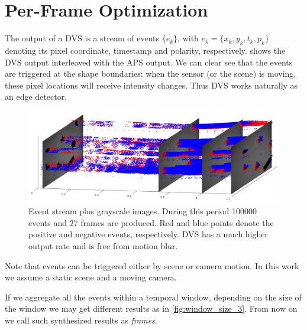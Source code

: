 \chapter{Per-Frame Optimization}
\label{chap:per_frame}
The output of a DVS is a stream of events $\{e_k\}$, with
$e_k=\{x_k,y_k,t_k,p_k\}$ denoting its pixel coordinate, timestamp and
polarity, respectively.  shows the DVS output
interleaved with the APS output. We can clear see that the events are
triggered at the shape boundaries: when the sensor (or the scene) is
moving, these pixel locations will receive intensity changes. Thus DVS
works naturally as an edge detector.

\begin{figure}[h]
  \centering \includegraphics[width = \textwidth]{images/stream.png}
  \caption{Event stream plus grayscale images. During this period
    \num{100000} events and \num{27} frames are produced. Red and blue
    points denote the positive and negative events, respectively. DVS
    has a much higher output rate and is free from motion blur.}
  \label{fig:stream}
\end{figure}
Note that events can be triggered either by scene or camera motion. In
this work we assume a static scene and a moving camera.

If we aggregate all the events within a temporal window, depending on
the size of the window we may get different results as in
\cref{fig:window_size_3}. From now on we call such synthesized results as \emph{frames}.


